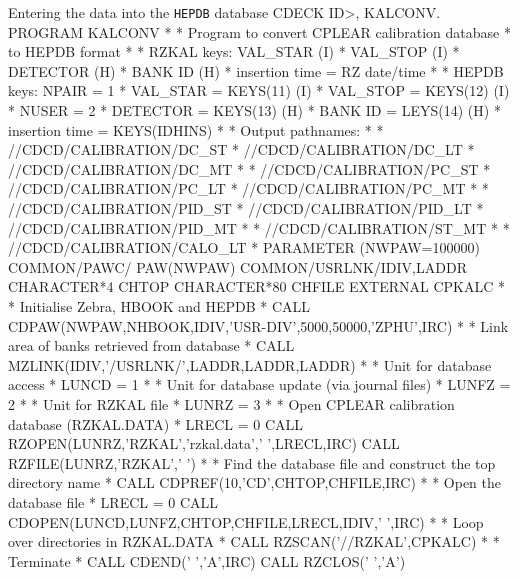 \begin{XMPt}{Entering the data into the {\tt HEPDB} database}
CDECK  ID>, KALCONV.
      PROGRAM KALCONV
*
*     Program to convert CPLEAR calibration database
*     to HEPDB format
*
*     RZKAL keys: VAL_STAR (I)
*                 VAL_STOP (I)
*                 DETECTOR (H)
*                 BANK ID  (H)
*     insertion time = RZ date/time
*
*     HEPDB keys: NPAIR    = 1
*                 VAL_STAR = KEYS(11) (I)
*                 VAL_STOP = KEYS(12) (I)
*                 NUSER    = 2
*                 DETECTOR = KEYS(13) (H)
*                 BANK ID  = LEYS(14) (H)
*     insertion time = KEYS(IDHINS)
*
*     Output pathnames:
*
*     //CDCD/CALIBRATION/DC_ST
*     //CDCD/CALIBRATION/DC_LT
*     //CDCD/CALIBRATION/DC_MT
*
*     //CDCD/CALIBRATION/PC_ST
*     //CDCD/CALIBRATION/PC_LT
*     //CDCD/CALIBRATION/PC_MT
*
*     //CDCD/CALIBRATION/PID_ST
*     //CDCD/CALIBRATION/PID_LT
*     //CDCD/CALIBRATION/PID_MT
*
*     //CDCD/CALIBRATION/ST_MT
*
*     //CDCD/CALIBRATION/CALO_LT
*
      PARAMETER    (NWPAW=100000)
      COMMON/PAWC/ PAW(NWPAW)
      COMMON/USRLNK/IDIV,LADDR
      CHARACTER*4  CHTOP
      CHARACTER*80 CHFILE
      EXTERNAL     CPKALC
*
*     Initialise Zebra, HBOOK and HEPDB
*
      CALL CDPAW(NWPAW,NHBOOK,IDIV,'USR-DIV',5000,50000,'ZPHU',IRC)
*
*     Link area of banks retrieved from database
*
      CALL MZLINK(IDIV,'/USRLNK/',LADDR,LADDR,LADDR)
*
*     Unit for database access
*
      LUNCD  = 1
*
*     Unit for database update (via journal files)
*
      LUNFZ  = 2
*
*     Unit for RZKAL file
*
      LUNRZ  = 3
*
*     Open CPLEAR calibration database (RZKAL.DATA)
*
      LRECL  = 0
      CALL RZOPEN(LUNRZ,'RZKAL','rzkal.data',' ',LRECL,IRC)
      CALL RZFILE(LUNRZ,'RZKAL',' ')
*
*     Find the database file and construct the top directory name
*
      CALL CDPREF(10,'CD',CHTOP,CHFILE,IRC)
*
*     Open the database file
*
      LRECL  = 0
      CALL CDOPEN(LUNCD,LUNFZ,CHTOP,CHFILE,LRECL,IDIV,' ',IRC)
*
*     Loop over directories in RZKAL.DATA
*
      CALL RZSCAN('//RZKAL',CPKALC)
*
*     Terminate
*
      CALL CDEND(' ','A',IRC)
      CALL RZCLOS(' ','A')


\end{XMPt}
